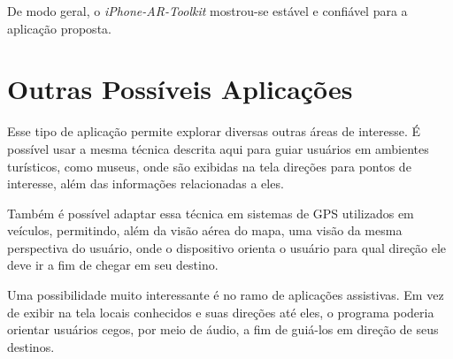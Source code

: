 De modo geral, o \textit{iPhone-AR-Toolkit} mostrou-se estável e confiável para a aplicação proposta.



\section{Outras Possíveis Aplicações}

Esse tipo de aplicação permite explorar diversas outras áreas de interesse.
É possível usar a mesma técnica descrita aqui para guiar usuários em ambientes
turísticos, como museus, onde são exibidas na tela direções para pontos de interesse,
além das informações relacionadas a eles.

Também é possível adaptar essa técnica em sistemas de \gls{GPS} utilizados em veículos,
permitindo, além da visão aérea do mapa, uma visão da mesma perspectiva do usuário, onde 
o dispositivo orienta o usuário para qual direção ele deve ir a fim de chegar em seu destino.

Uma possibilidade muito interessante é no ramo de aplicações assistivas. Em vez de exibir na tela
locais conhecidos e suas direções até eles, o programa poderia orientar usuários cegos, por meio de
áudio, a fim de guiá-los em direção de seus destinos. 
